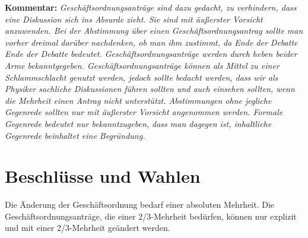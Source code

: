 \documentclass[draft,12pt,oneside]{scrreprt}
\begin{document}
\textbf{Kommentar:} \textit{\footnotesize Geschäftsordnungsanträge sind dazu
  gedacht, zu verhindern, dass eine Diskussion sich ins Absurde zieht.
  Sie sind mit äußerster Vorsicht anzuwenden.
  Bei der Abstimmung über einen Geschäftsordnungsantrag sollte man vorher dreimal
  darüber nachdenken, ob man ihm zustimmt, da Ende der Debatte Ende der Debatte
  bedeutet.
  Geschäftsordnungsanträge werden durch heben beider Arme bekanntgegeben.
  Geschäftsordnungsanträge können als Mittel zu einer Schlammschlacht genutzt
  werden, jedoch sollte bedacht werden, dass wir als Physiker sachliche
  Diskussionen führen sollten und auch einsehen sollten, wenn die Mehrheit einen
  Antrag nicht unterstützt.
  Abstimmungen ohne jegliche Gegenrede sollten nur mit äußerster Vorsicht
  angenommen werden.
  Formale Gegenrede bedeutet nur bekanntzugeben, dass man dagegen ist, inhaltliche
  Gegenrede beinhaltet eine Begründung.}

\section{Beschlüsse und Wahlen}

        Die Änderung der Geschäftsordnung bedarf einer absoluten Mehrheit.
        Die Geschäftsordnungsanträge, die einer 2/3-Mehrheit bedürfen, können nur
        explizit und mit einer 2/3-Mehrheit geändert werden.
\end{document}
